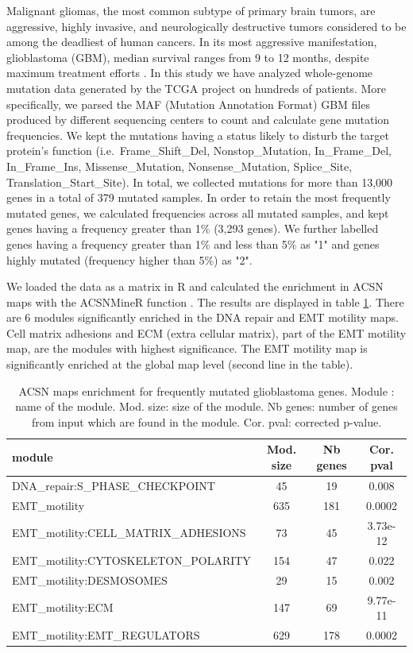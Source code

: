 Malignant gliomas, the most common subtype of primary brain tumors, are
aggressive, highly invasive, and neurologically destructive tumors considered
to be among the deadliest of human cancers. In its most aggressive
manifestation, glioblastoma (GBM), median survival ranges from 9 to 12 months,
despite maximum treatment efforts \citep{maher2001malignant}. In this study we
have analyzed whole-genome mutation data generated by the TCGA project on
hundreds of patients. More specifically, we parsed the MAF (Mutation Annotation
Format) GBM files produced by different sequencing centers to count and
calculate gene mutation frequencies. We kept the mutations having a status
likely to disturb the target protein's function (i.e.\, Frame\_Shift\_Del,
Nonstop\_Mutation, In\_Frame\_Del, In\_Frame\_Ins, Missense\_Mutation,
Nonsense\_Mutation, Splice\_Site, Translation\_Start\_Site). In total, we
collected mutations for more than 13,000 genes in a total of 379 mutated
samples. In order to retain the most frequently mutated genes, we calculated
frequencies across all mutated samples, and kept genes having a frequency
greater than 1\% (3,293 genes). We further labelled genes having a frequency
greater than 1\% and less than 5\% as "1" and genes highly mutated (frequency
higher than 5\%) as "2". 

We loaded the data as a matrix in R and calculated the enrichment in ACSN maps
with the ACSNMineR function . The results are displayed in
table \ref{tab:table_gbm}. There are 6 modules significantly enriched in the
DNA repair and EMT motility maps. Cell matrix adhesions and ECM
(extra cellular matrix), part of the EMT motility map, are the modules with
highest significance. The EMT motility map is significantly enriched at the
global map level (second line in the table). 

\begin{table}[h!]
  \centering
  \caption{ACSN maps enrichment for frequently mutated glioblastoma genes.
  Module : name of the module. Mod. size: size of the module. Nb genes: number
  of genes from input which are found in the module. Cor. pval: corrected
  p-value.} 
  \label{tab:table_gbm}

\begin{tabular}{l c c c}
\toprule
module & Mod. size & Nb genes & Cor. pval\\ 
\midrule
DNA\_repair:S\_PHASE\_CHECKPOINT &   45 &      19 &     0.008\\
EMT\_motility  &  635  &   181  &   0.0002\\
EMT\_motility:CELL\_MATRIX\_ADHESIONS   &   73  &    45  &    3.73e-12\\
EMT\_motility:CYTOSKELETON\_POLARITY   &   154 &    47  &    0.022\\
EMT\_motility:DESMOSOMES & 29  &    15  &    0.002\\
EMT\_motility:ECM    &    147  &   69   &   9.77e-11\\
EMT\_motility:EMT\_REGULATORS  &   629   &  178  &   0.0002\\
\bottomrule
\end{tabular}
\end{table}

